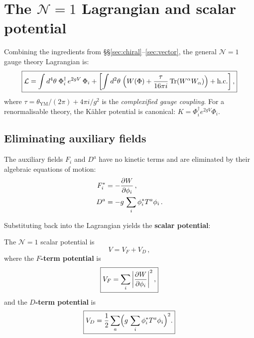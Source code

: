 \documentclass[11pt,a4paper]{article}
\begin{document}
\section{The $\mathcal{N}=1$ Lagrangian and scalar potential}
\label{sec:lagrangian}

Combining the ingredients from
\S\S\ref{sec:chiral}--\ref{sec:vector}, the general $\mathcal{N}=1$
gauge theory Lagrangian is:
\begin{equation}
  \boxed{
    \mathcal{L} = \int d^4\theta\;
    \Phi_i^\dagger\, e^{2gV}\, \Phi_i
    + \left[\int d^2\theta\;\Bigl(
      W(\Phi) + \frac{\tau}{16\pi i}\,
      \mathrm{Tr}(W^\alpha W_\alpha)
    \Bigr) + \text{h.c.}\right],
  }
  \label{eq:N1-lagrangian}
\end{equation}
where $\tau = \theta_{\text{YM}}/(2\pi) + 4\pi i / g^2$ is the
\emph{complexified gauge coupling}.  For a renormalisable theory, the
K\"ahler potential is canonical: $K = \Phi_i^\dagger e^{2gV} \Phi_i$.

\subsection{Eliminating auxiliary fields}
\label{sec:aux-elim}

The auxiliary fields $F_i$ and $D^a$ have no kinetic terms and are
eliminated by their algebraic equations of motion:
\begin{align}
  F_i^* &= -\frac{\partial W}{\partial \phi_i}\,,
  \label{eq:F-eom} \\
  D^a &= -g\, \sum_i \phi_i^* T^a \phi_i\,.
  \label{eq:D-eom}
\end{align}

Substituting back into the Lagrangian yields the \textbf{scalar
potential}:

\begin{definition}
\label{def:scalar-potential}
The $\mathcal{N}=1$ scalar potential is
\begin{equation}
  \boxed{
    V = V_F + V_D\,,
  }
  \label{eq:V-total}
\end{equation}
where the \textbf{$F$-term potential} is
\begin{equation}
  \boxed{
    V_F = \sum_i \left|\frac{\partial W}{\partial \phi_i}\right|^2,
  }
  \label{eq:VF}
\end{equation}
and the \textbf{$D$-term potential} is
\begin{equation}
  \boxed{
    V_D = \frac{1}{2}\sum_a
    \Bigl(g\, \sum_i \phi_i^* T^a \phi_i\Bigr)^2.
  }
  \label{eq:VD}
\end{equation}
\end{definition}
\end{document}

